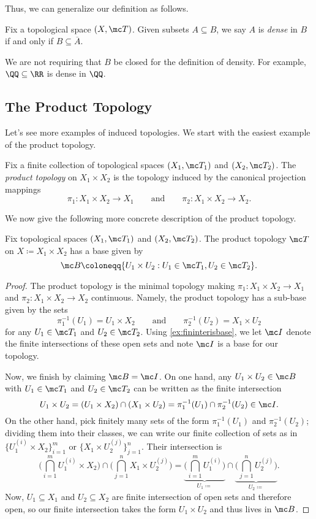 \documentclass[../notes.tex]{subfiles}
\begin{document}
Thus, we can generalize our definition as follows.
\begin{defi}[Dense]
	Fix a topological space $(X,\mc T)$. Given subsets $A\subseteq B$, we say $A$ is \textit{dense} in $B$ if and only if $B\subseteq\overline A$.
\end{defi}
\begin{remark}
	We are not requiring that $B$ be closed for the definition of density. For example, $\QQ\subseteq\RR$ is dense in $\QQ$.
\end{remark}

\subsection{The Product Topology}
Let's see more examples of induced topologies. We start with the easiest example of the product topology.
\begin{defihelper}
	Fix a finite collection of topological spaces $(X_1,\mc T_1)$ and $(X_2,\mc T_2)$. The \textit{product topology} on $X_1\times X_2$ is the topology induced by the canonical projection mappings
	\[\pi_1\colon X_1\times X_2\to X_1\qquad\text{and}\qquad\pi_2\colon X_1\times X_2\to X_2.\]
\end{defihelper}
We now give the following more concrete description of the product topology.
\begin{lemma} \label{lem:twoprodtop}
	Fix topological spaces $(X_1,\mc T_1)$ and $(X_2,\mc T_2)$. The product topology $\mc T$ on $X\coloneqq X_1\times X_2$ has a base given by
	\[\mc B\coloneqq\{U_1\times U_2:U_1\in\mc T_1,U_2\in\mc T_2\}.\]
\end{lemma}
\begin{proof}
	The product topology is the minimal topology making $\pi_1\colon X_1\times X_2\to X_1$ and $\pi_2\colon X_1\times X_2\to X_2$ continuous. Namely, the product topology has a sub-base given by the sets
	\[\pi_1^{-1}(U_1)=U_1\times X_2\qquad\text{and}\qquad\pi_2^{-1}(U_2)=X_1\times U_2\]
	for any $U_1\in\mc T_1$ and $U_2\in\mc T_2$. Using \autoref{ex:fininterisbase}, we let $\mc I$ denote the finite intersections of these open sets and note $\mc I$ is a base for our topology.
	
	Now, we finish by claiming $\mc B=\mc I$. On one hand, any $U_1\times U_2\in\mc B$ with $U_1\in\mc T_1$ and $U_2\in\mc T_2$ can be written as the finite intersection
	\[U_1\times U_2=(U_1\times X_2)\cap(X_1\times U_2)=\pi_1^{-1}(U_1)\cap\pi_2^{-1}(U_2)\in\mc I.\]
	On the other hand, pick finitely many sets of the form $\pi_1^{-1}(U_1)$ and $\pi_2^{-1}(U_2)$; dividing them into their classes, we can write our finite collection of sets as in $\{U_1^{(i)}\times X_2\}_{i=1}^m$ or $\{X_1\times U_2^{(j)}\}_{j=1}^n$. Their intersection is
	\[\Bigg(\bigcap_{i=1}^mU_1^{(i)}\times X_2\Bigg)\cap\Bigg(\bigcap_{j=1}^nX_1\times U_2^{(j)}\Bigg)=\underbrace{\Bigg(\bigcap_{i=1}^mU_1^{(i)}\Bigg)}_{U_1\coloneqq}\cap\underbrace{\Bigg(\bigcap_{j=1}^nU_2^{(j)}\Bigg)}_{U_2\coloneqq}.\]
	Now, $U_1\subseteq X_1$ and $U_2\subseteq X_2$ are finite intersection of open sets and therefore open, so our finite intersection takes the form $U_1\times U_2$ and thus lives in $\mc B$.
\end{proof}
\end{document}
